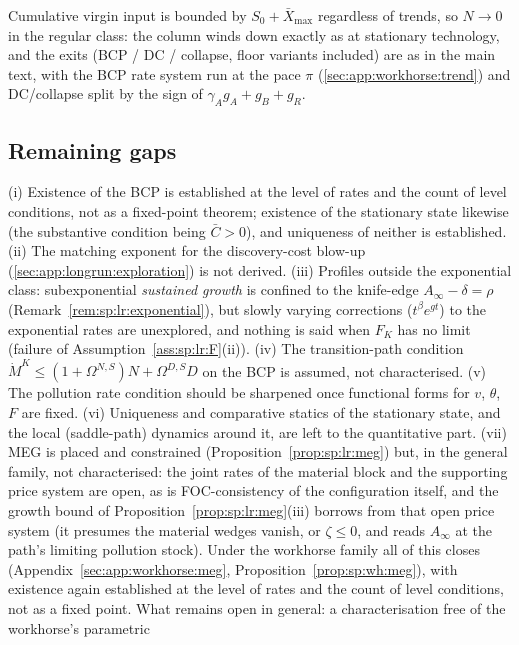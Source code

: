  Cumulative virgin input is bounded by $S_0+\bar X_{\max}$
regardless of trends, so $N\to0$ in the regular class: the column winds down exactly as at
stationary technology, and the exits (BCP / DC / collapse, floor variants included) are as
in the main text, with the BCP rate system run at the pace $\pi$
(\ref{sec:app:workhorse:trend}) and DC/collapse split by the sign of
$\gamma_Ag_A+g_B+g_R$.

\subsection{Remaining gaps}\label{sec:app:longrun:gaps}

(i) Existence of the BCP is established at the level of rates and the count of level
conditions, not as a fixed-point theorem; existence of the stationary state likewise (the
substantive condition being $\bar C>0$), and uniqueness of neither is established. (ii) The
matching exponent for the discovery-cost blow-up (\ref{sec:app:longrun:exploration}) is not
derived. (iii) Profiles outside the exponential class: subexponential \emph{sustained growth}
is confined to the knife-edge $A_\infty-\delta=\rho$ (Remark~\ref{rem:sp:lr:exponential}), but
slowly varying corrections ($t^\beta e^{gt}$) to the exponential rates are unexplored, and
nothing is said when $F_K$ has no limit (failure of Assumption~\ref{ass:sp:lr:F}(ii)).
(iv) The transition-path condition
$\dot M^K\le\left(1+\Omega^{N,S}\right)N+\Omega^{D,S}D$ on the BCP is assumed, not
characterised. (v) The pollution rate condition should be sharpened once functional forms for
$v$, $\theta$, $F$ are fixed. (vi) Uniqueness and comparative statics of the stationary state,
and the local (saddle-path) dynamics around it, are left to the quantitative part. (vii) MEG is
placed and constrained (Proposition~\ref{prop:sp:lr:meg}) but, in the general family, not
characterised: the joint rates of the material block and the supporting price system are open,
as is FOC-consistency of the configuration itself, and the growth bound of
Proposition~\ref{prop:sp:lr:meg}(iii) borrows from that open price system (it presumes the
material wedges vanish, or $\zeta\le0$, and reads $A_\infty$ at the path's limiting pollution
stock). Under the workhorse family all of this closes
(Appendix~\ref{sec:app:workhorse:meg}, Proposition~\ref{prop:sp:wh:meg}), with existence
again established at the level of rates and the count of level conditions, not as a fixed
point. What remains open in general: a characterisation free of the workhorse's parametric
